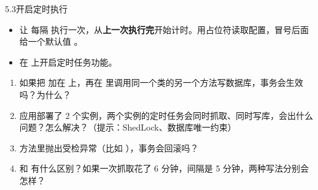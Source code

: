 \begin{task}{5.3\quad 开启定时执行}
\begin{itemize}
  \item 让  每隔  执行一次，从\textbf{上一次执行完}开始计时。用占位符读取配置，冒号后面给一个默认值 。
  \item 在  上开启定时任务功能。
\end{itemize}
\end{task}

\begin{think}
\begin{enumerate}
  \item 如果把  加在  上，再在  里调用同一个类的另一个方法写数据库，事务会生效吗？为什么？
  \item 应用部署了 2 个实例，两个实例的定时任务会同时抓取、同时写库，会出什么问题？怎么解决？（提示：ShedLock、数据库唯一约束）
  \item {} 方法里抛出受检异常（比如 ），事务会回滚吗？
  \item {} 和  有什么区别？如果一次抓取花了 6 分钟，间隔是 5 分钟，两种写法分别会怎样？
\end{enumerate}
\end{think}
